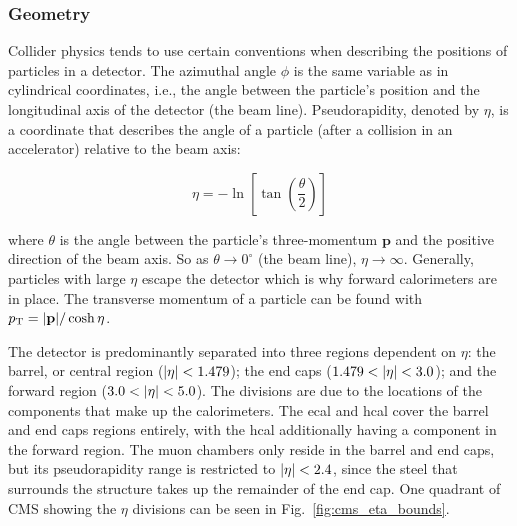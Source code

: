 



\subsubsection{Geometry}
\label{subsubsec:geometry}

Collider physics tends to use certain conventions when describing the positions of particles in a detector. The azimuthal angle $\phi$ is the same variable as in cylindrical coordinates, i.e., the angle between the particle's position and the longitudinal axis of the detector (the beam line). Pseudorapidity, denoted by $\eta$, is a coordinate that describes the angle of a particle (after a collision in an accelerator) relative to the beam axis:

\begin{equation}
    \eta = -\ln \left[ \tan \left( \frac{\theta}{2} \right) \right]
    \label{eq:eta_def}
\end{equation}

where $\theta$ is the angle between the particle's three-momentum $\mathbf{p}$ and the positive direction of the beam axis. So as $\theta \rightarrow 0^{\circ}$ (the beam line), $\eta \rightarrow \infty$. Generally, particles with large $\eta$ escape the detector which is why forward calorimeters are in place. The transverse momentum of a particle can be found with $p_{\mathrm{T}} = \lvert \mathbf{p} \rvert / \cosh \eta$.

The detector is predominantly separated into three regions dependent on $\eta$: the barrel, or central region ($\lvert \eta \rvert < 1.479$); the end caps ($1.479 < \lvert \eta \rvert < 3.0$); and the forward region ($3.0 < \lvert \eta \rvert < 5.0$). The divisions are due to the locations of the components that make up the calorimeters. The \acrshort{ecal} and \acrshort{hcal} cover the barrel and end caps regions entirely, with the \acrshort{hcal} additionally having a component in the forward region. The muon chambers only reside in the barrel and end caps, but its pseudorapidity range is restricted to $\lvert \eta \rvert < 2.4$, since the steel that surrounds the structure takes up the remainder of the end cap. One quadrant of CMS showing the $\eta$ divisions can be seen in Fig.~\ref{fig:cms_eta_bounds}.


